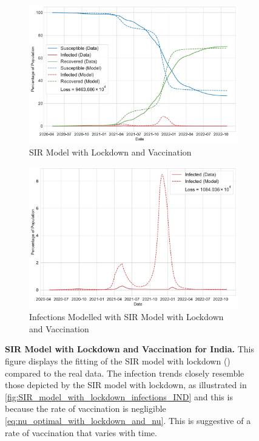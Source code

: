 \documentclass[tikz,fleqn,12pt]{wlscirep}
\begin{document}
\begin{figure}[htbp!]
  \centering
  \begin{subfigure}[t]{\textwidth}
    \centering
    \includegraphics[scale=0.35]{images/SIR_model_with_lockdown_with_vaccination_IND.pdf}
    \caption{SIR Model with Lockdown and Vaccination}
    \label{fig:SIR_model_with_lockdown_with_vaccination_IND}
  \end{subfigure}
  \begin{subfigure}[t]{\textwidth}
    \centering
    \includegraphics[scale=0.35]{images/SIR_model_with_lockdown_with_vaccination_infections_IND.pdf}
    \caption{Infections Modelled with SIR Model with Lockdown and Vaccination}
    \label{fig:SIR_model_with_lockdown_with_vaccination_infections_IND}
  \end{subfigure}
  \caption{\textbf{SIR Model with Lockdown and Vaccination for India.} This figure displays the fitting of the SIR model with lockdown () compared to the real data. The infection trends closely resemble those depicted by the SIR model with lockdown, as illustrated in \cref{fig:SIR_model_with_lockdown_infections_IND} and this is because the rate of vaccination is negligible \cref{eq:nu_optimal_with_lockdown_and_nu}. This is suggestive of a rate of vaccination that varies with time.}
  \label{fig:SIR_model_with_lockdown_with_vaccination_IND_parent}
\end{figure}
\end{document}
